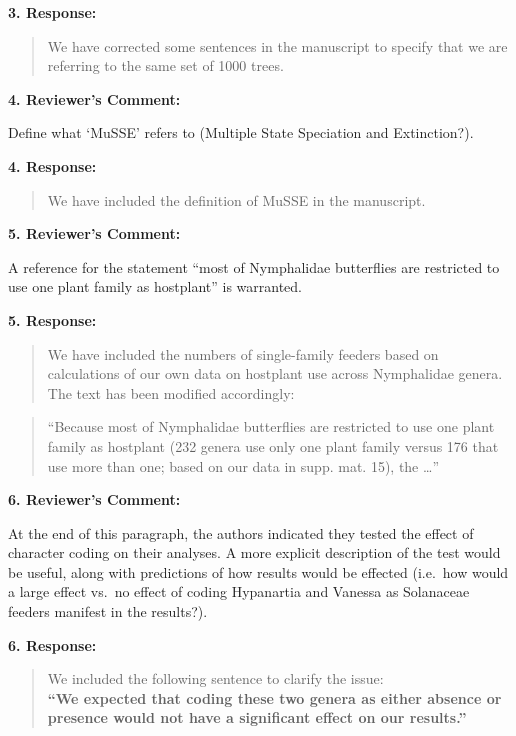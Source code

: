 \documentclass[]{article}
\begin{document}
\textbf{3. Response:}

\begin{quote}
\color{blue}
We have corrected some sentences in the manuscript to specify that we
are referring to the same set of 1000 trees.
\end{quote}

\textbf{4. Reviewer's Comment:}

Define what `MuSSE' refers to (Multiple State Speciation and
Extinction?).

\textbf{4. Response:}

\begin{quote}
\color{blue}
We have included the definition of MuSSE in the manuscript.
\end{quote}

\textbf{5. Reviewer's Comment:}

A reference for the statement ``most of Nymphalidae butterflies are
restricted to use one plant family as hostplant'' is warranted.

\textbf{5. Response:}

\begin{quote}
\color{blue}
We have included the numbers of single-family feeders based on
calculations of our own data on hostplant use across Nymphalidae genera.
The text has been modified accordingly:
\end{quote}

\begin{quote}
\color{blue}
``Because most of Nymphalidae butterflies are restricted to use one
plant family as hostplant (232 genera use only one plant family versus
176 that use more than one; based on our data in supp. mat. 15), the
\ldots{}''
\end{quote}

\textbf{6. Reviewer's Comment:}

At the end of this paragraph, the authors indicated they tested the
effect of character coding on their analyses. A more explicit
description of the test would be useful, along with predictions of how
results would be effected (i.e.~how would a large effect vs.~no effect
of coding Hypanartia and Vanessa as Solanaceae feeders manifest in the
results?).

\textbf{6. Response:}

\begin{quote}
\color{blue}
We included the following sentence to clarify the issue:\\\textbf{``We
expected that coding these two genera as either absence or presence
would not have a significant effect on our results.''}
\end{quote}
\end{document}
